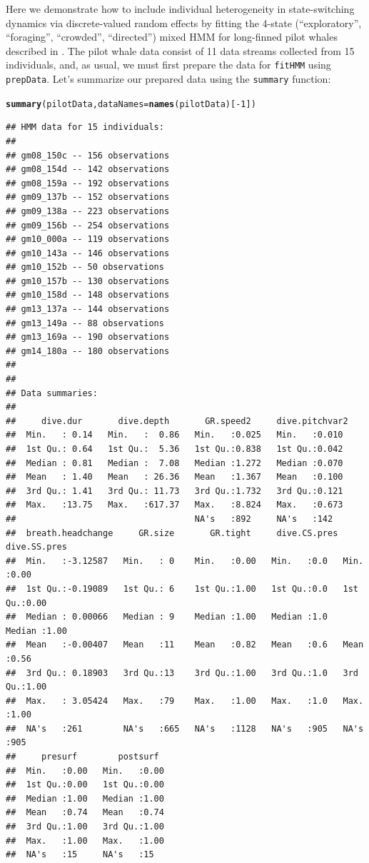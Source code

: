 \documentclass[12pt]{article}\usepackage[]{graphicx}\usepackage[]{color}
\makeatletter
\newcommand{\hlnum}[1]{\textcolor[rgb]{0.686,0.059,0.569}{#1}}%
\newcommand{\hlopt}[1]{\textcolor[rgb]{0,0,0}{#1}}%
\newcommand{\hlstd}[1]{\textcolor[rgb]{0.345,0.345,0.345}{#1}}%
\newcommand{\hlkwc}[1]{\textcolor[rgb]{0.333,0.667,0.333}{#1}}%
\newcommand{\hlkwd}[1]{\textcolor[rgb]{0.737,0.353,0.396}{\textbf{#1}}}%
\newenvironment{kframe}{%
 \def\at@end@of@kframe{}%
 \ifinner\ifhmode%
  \def\at@end@of@kframe{\end{minipage}}%
  \begin{minipage}{\columnwidth}%
 \fi\fi%
 \def\FrameCommand##1{\hskip\@totalleftmargin \hskip-\fboxsep
 \colorbox{shadecolor}{##1}\hskip-\fboxsep
     \hskip-\linewidth \hskip-\@totalleftmargin \hskip\columnwidth}%
 \MakeFramed {\advance\hsize-\width
   \@totalleftmargin\z@ \linewidth\hsize
   \@setminipage}}%
 {\par\unskip\endMakeFramed%
 \at@end@of@kframe}
\newenvironment{knitrout}{}{} %
\makeatother
\begin{document}
Here we demonstrate how to include individual heterogeneity in state-switching dynamics via discrete-valued random effects by fitting the 4-state (``exploratory'', ``foraging'', ``crowded'', ``directed'') mixed HMM for long-finned pilot whales described in \cite{IsojunnoEtAl2017}.  The pilot whale data consist of 11 data streams collected from 15 individuals, and, as usual, we must first prepare the data for \verb|fitHMM| using \verb|prepData|. Let's summarize our prepared data using the \verb|summary| function:
\begin{knitrout}
\color{fgcolor}\begin{kframe}
\begin{alltt}
\hlkwd{summary}\hlstd{(pilotData,} \hlkwc{dataNames}\hlstd{=}\hlkwd{names}\hlstd{(pilotData)[}\hlopt{-}\hlnum{1}\hlstd{])}
\end{alltt}
\begin{verbatim}
## HMM data for 15 individuals:
## 
## gm08_150c -- 156 observations
## gm08_154d -- 142 observations
## gm08_159a -- 192 observations
## gm09_137b -- 152 observations
## gm09_138a -- 223 observations
## gm09_156b -- 254 observations
## gm10_000a -- 119 observations
## gm10_143a -- 146 observations
## gm10_152b -- 50 observations
## gm10_157b -- 130 observations
## gm10_158d -- 148 observations
## gm13_137a -- 144 observations
## gm13_149a -- 88 observations
## gm13_169a -- 190 observations
## gm14_180a -- 180 observations
## 
## 
## Data summaries:
## 
##     dive.dur       dive.depth       GR.speed2     dive.pitchvar2 
##  Min.   : 0.14   Min.   :  0.86   Min.   :0.025   Min.   :0.010  
##  1st Qu.: 0.64   1st Qu.:  5.36   1st Qu.:0.838   1st Qu.:0.042  
##  Median : 0.81   Median :  7.08   Median :1.272   Median :0.070  
##  Mean   : 1.40   Mean   : 26.36   Mean   :1.367   Mean   :0.100  
##  3rd Qu.: 1.41   3rd Qu.: 11.73   3rd Qu.:1.732   3rd Qu.:0.121  
##  Max.   :13.75   Max.   :617.37   Max.   :8.824   Max.   :0.673  
##                                   NA's   :892     NA's   :142    
##  breath.headchange     GR.size       GR.tight     dive.CS.pres  dive.SS.pres 
##  Min.   :-3.12587   Min.   : 0    Min.   :0.00   Min.   :0.0   Min.   :0.00  
##  1st Qu.:-0.19089   1st Qu.: 6    1st Qu.:1.00   1st Qu.:0.0   1st Qu.:0.00  
##  Median : 0.00066   Median : 9    Median :1.00   Median :1.0   Median :1.00  
##  Mean   :-0.00407   Mean   :11    Mean   :0.82   Mean   :0.6   Mean   :0.56  
##  3rd Qu.: 0.18903   3rd Qu.:13    3rd Qu.:1.00   3rd Qu.:1.0   3rd Qu.:1.00  
##  Max.   : 3.05424   Max.   :79    Max.   :1.00   Max.   :1.0   Max.   :1.00  
##  NA's   :261        NA's   :665   NA's   :1128   NA's   :905   NA's   :905   
##     presurf        postsurf   
##  Min.   :0.00   Min.   :0.00  
##  1st Qu.:0.00   1st Qu.:0.00  
##  Median :1.00   Median :1.00  
##  Mean   :0.74   Mean   :0.74  
##  3rd Qu.:1.00   3rd Qu.:1.00  
##  Max.   :1.00   Max.   :1.00  
##  NA's   :15     NA's   :15
\end{verbatim}
\end{kframe}
\end{knitrout}
\end{document}
